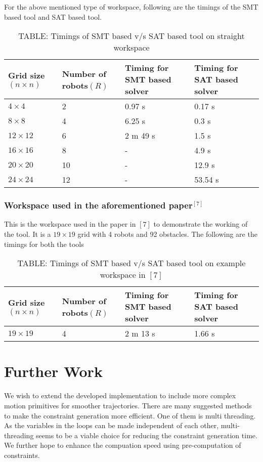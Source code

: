 \documentclass{article}[11pt]
\begin{document}
			For the above mentioned type of workspace, following are the timings of the SMT based tool and SAT based tool.
				\begin{table}[h!]
				\centering
				\begin{tabular}{|| p{2cm} | p{2cm} | p{2cm} | p{2cm} ||} 
				 \hline\hline
				 Grid size$(n \times n)$ & Number of robots$(R)$ & Timing for SMT based solver & Timing for SAT based solver \\ [0.5ex] 
				 \hline\hline
				 $4 \times 4$ & 2 & 0.97 s & 0.17 s \\ 
				 $8 \times 8$ & 4 & 6.25 s & 0.3 s \\
				 $12 \times 12$ & 6 & 2 m 49 s & 1.5 s \\
				 $16 \times 16$ & 8 & - & 4.9 s \\
				 $20 \times 20$ & 10 & - & 12.9 s \\
				 $24 \times 24$ & 12 & - & 53.54 s  \\ [1ex]
				 \hline
				\end{tabular}
				\caption*{TABLE: Timings of SMT based v/s SAT based tool on straight workspace}
				\end{table}

			\subsubsection{Workspace used in the aforementioned paper$^{[7]}$}
			This is the workspace used in the paper in $[7]$ to demonstrate the working of the tool. It is a $19 \times 19$ grid with 4 robots and 92 obstacles. The following are the timings for both the tools
				\begin{table}[h!]
				\centering
				\begin{tabular}{|| p{2cm} | p{2cm} | p{2cm} | p{2cm} ||} 
				 \hline\hline
				 Grid size$(n \times n)$ & Number of robots$(R)$ & Timing for SMT based solver & Timing for SAT based solver \\ [0.5ex] 
				 \hline\hline
				 $19 \times 19$ & 4 & 2 m 13 s & 1.66 s  \\ [1ex]
				 \hline
				\end{tabular}
				\caption*{TABLE: Timings of SMT based v/s SAT based tool on example workspace in $[7]$}
				\end{table}


	\section{Further Work}
		We wish to extend the developed implementation to include more complex motion primitives for smoother trajectories.
		There are many suggested methods to make the constraint generation more efficient. One of them is multi threading. As the variables in the loops can be made independent of each other, multi-threading seems to be a viable choice for reducing the constraint generation time. 
		We further hope to enhance the compuation speed using pre-computation of constraints.
\end{document}

